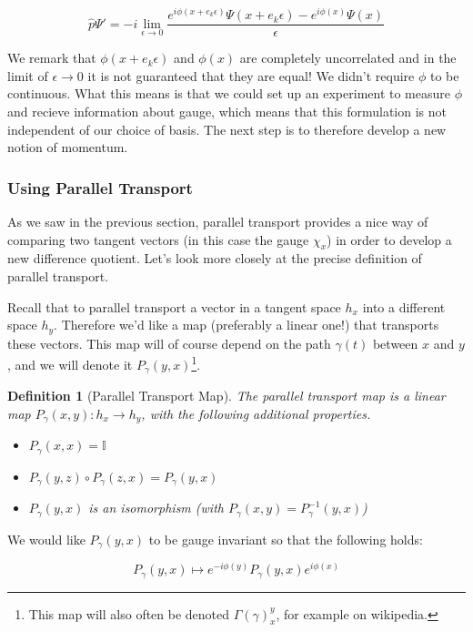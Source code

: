 \documentclass{article}
\newtheorem{defn}{Definition}
\begin{document}
\[\hat p \Psi' = -i \lim_{\epsilon \to 0}\frac{e^{i\phi(x+e_k\epsilon)}\Psi(x+e_k\epsilon) - e^{i\phi(x)}\Psi(x)}{\epsilon}\]

We remark that $\phi(x+e_k \epsilon)$ and $ \phi(x)$ are completely uncorrelated and in the limit of $\epsilon \to 0$ it is not guaranteed that they are equal! 
We didn't require $\phi$ to be continuous. What this means is that we could set up an experiment to measure $\phi$ and recieve information about gauge, which means that this formulation is not independent of our choice of basis. The next step is to therefore develop a new notion of momentum.

\subsubsection{Using Parallel Transport}

As we saw in the previous section, parallel transport provides a nice way of comparing two tangent vectors (in this case the gauge $\chi_x$) in order to develop a new difference quotient. Let's look more closely at the precise definition of parallel transport. 

Recall that to parallel transport a vector in a tangent space $h_x$ into a different space $h_y$. Therefore we'd like a map (preferably a linear one!) that transports these vectors. This map will of course depend on the path $\gamma(t)$ between $x$ and $y$, and we will denote it $P_\gamma(y,x)$\footnote{This map will also often be denoted $\Gamma(\gamma)_x^y$, for example on wikipedia.}.

\begin{defn}[Parallel Transport Map] The parallel transport map is a linear map $P_\gamma(x,y) : h_x \to h_y$, with the following additional properties.
\begin{itemize}\setlength\itemsep{0.5em}
\item$ P_\gamma(x,x) = \mathbb{I}$
\item$ P_\gamma(y,z) \circ P_\gamma(z,x) = P_\gamma(y,x)$
\item$ P_\gamma(y,x)$ is an isomorphism (with $P_\gamma(x,y)=P^{-1}_\gamma(y,x)$)
\end{itemize}
\end{defn}
 
We would like $P_\gamma(y,x)$ to be gauge invariant so that the following holds:

\begin{equation}
P_\gamma(y,x) \mapsto e^{-i\phi(y)}P_\gamma(y,x) e^{i\phi(x)}
\end{equation}
\end{document}
